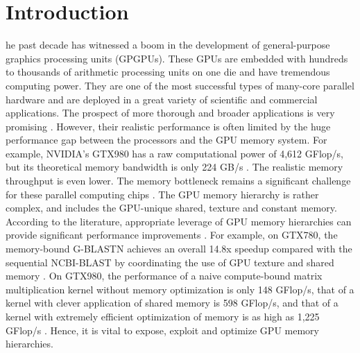 \documentclass[10pt,journal,compsoc]{IEEEtran}
\theoremstyle{definition}
\begin{document}
\IEEEpeerreviewmaketitle

\section{Introduction}


he past decade has witnessed a boom in the development of general-purpose graphics processing units (GPGPUs). These GPUs are embedded with hundreds to thousands of arithmetic processing units on one die and have tremendous computing power. They are one of the most successful types of many-core parallel hardware and are deployed in a great variety of scientific and commercial applications. The prospect of more thorough and broader applications is very promising \cite{nickolls2010gpu,Hwu20142574,keckler2011gpus,zhao2014g,li2014accelerating,ryoo2008optimization}. However, their realistic performance is often limited by the huge performance gap between the processors and the GPU memory system. For example, NVIDIA's GTX980 has a raw computational power of 4,612 GFlop/s, but its theoretical memory bandwidth is only 224 GB/s \cite{MaxwellWhitepaper}. The realistic memory throughput is even lower. The memory bottleneck remains a significant challenge for these parallel computing chips \cite{Hwu20142574,keckler2011gpus}. The GPU memory hierarchy is rather complex, and includes the GPU-unique shared, texture and constant memory. According to the literature, appropriate leverage of GPU memory hierarchies can provide significant performance improvements \cite{micikevicius20093d,zhao2014g,li2014accelerating,ryoo2008optimization}. For example, on GTX780, the memory-bound G-BLASTN achieves an overall 14.8x speedup compared with the sequential NCBI-BLAST by coordinating the use of GPU texture and shared memory \cite{zhao2014g}. On GTX980, the performance of a naive compute-bound matrix multiplication kernel without memory optimization is only 148 GFlop/s, that of a kernel with clever application of shared memory is 598 GFlop/s, and that of a kernel with extremely efficient optimization of memory is as high as 1,225 GFlop/s \cite{matrixmul_SDK,matrixmulCUBLAS_SDK}. Hence, it is vital to expose, exploit and optimize GPU memory hierarchies.
\end{document}
